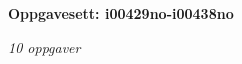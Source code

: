 \centerline{\bf Oppgavesett: i00429no-i00438no}
\vskip 10pt
\centerline{\it 10 oppgaver}\vskip 10pt
\vskip 10pt
